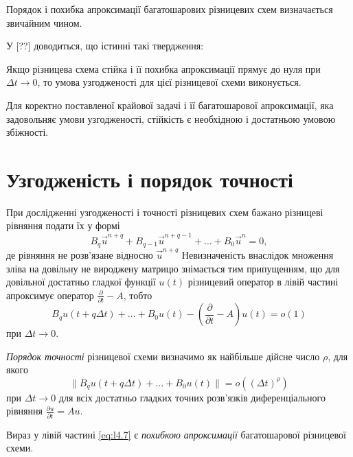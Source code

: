 Порядок і похибка апроксимації багатошарових різницевих схем визначається звичайним чином. \medskip

У [??] доводиться, що істинні такі твердження:
\begin{proposition}
    Якщо різницева схема стійка і її похибка апроксимації прямує до нуля при $\Delta t \to 0$, то умова узгодженості для цієї різницевої схеми виконується.
\end{proposition}
	
\begin{proposition}
    Для коректно поставленої крайової задачі і її багатошарової апроксимації, яка задовольняє умови узгодженості, стійкість є необхідною і достатньою умовою збіжності.
\end{proposition}

\section{Узгодженість і порядок точності}

При дослідженні узгодженості і точності різницевих схем бажано різницеві рівняння подати їх у формі 
\begin{equation}
    B_q \vec u^{n + q} + B_{q - 1} \vec u^{n + q - 1} + \ldots + B_0 \vec u^n = 0,
\end{equation}
де рівняння не розв'язане відносно $\vec u^{n + q}$ Невизначеність внаслідок множення зліва на довільну не вироджену матрицю знімається тим припущенням, що для довільної достатньо гладкої функції $u(t)$ різницевий оператор в лівій частині апроксимує оператор $\frac{\partial}{\partial t} - A$, тобто
\begin{equation}
    B_q u(t + q \Delta t) + \ldots + B_0 u(t) - \left(\frac{\partial}{\partial t} - A \right) u(t) = o(1)
\end{equation}
при $\Delta t \to 0$. \medskip
 
\begin{definition}
    \textit{Порядок точності} різницевої схеми визначимо як найбільше дійсне число $\rho$, для якого 
    \begin{equation}
        \label{eq:l4.7}
        \| B_q u(t + q \Delta t) + \ldots + B_0 u(t) \| = o((\Delta t)^\rho)
    \end{equation}
    при $\Delta t \to 0$ для всіх достатньо гладких точних розв'язків диференціального рівняння $\frac{\partial u}{\partial t} = A u$.
\end{definition}

\begin{definition}
    Вираз у лівій частині \eqref{eq:l4.7} є \textit{похибкою апроксимації} багатошарової різницевої схеми.
\end{definition}

